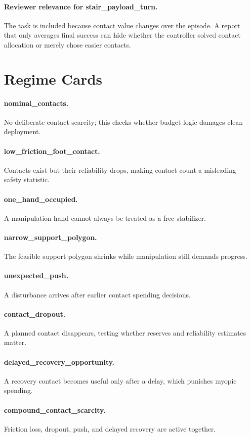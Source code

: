 \documentclass{article}
\begin{document}
\paragraph{Reviewer relevance for stair\_payload\_turn.} The task is included because contact value changes over the episode. A report that only averages final success can hide whether the controller solved contact allocation or merely chose easier contacts.
\clearpage
\section{Regime Cards}
\paragraph{nominal\_contacts.} No deliberate contact scarcity; this checks whether budget logic damages clean deployment.
\paragraph{low\_friction\_foot\_contact.} Contacts exist but their reliability drops, making contact count a misleading safety statistic.
\paragraph{one\_hand\_occupied.} A manipulation hand cannot always be treated as a free stabilizer.
\paragraph{narrow\_support\_polygon.} The feasible support polygon shrinks while manipulation still demands progress.
\paragraph{unexpected\_push.} A disturbance arrives after earlier contact spending decisions.
\paragraph{contact\_dropout.} A planned contact disappears, testing whether reserves and reliability estimates matter.
\paragraph{delayed\_recovery\_opportunity.} A recovery contact becomes useful only after a delay, which punishes myopic spending.
\paragraph{compound\_contact\_scarcity.} Friction loss, dropout, push, and delayed recovery are active together.
\end{document}

